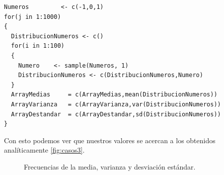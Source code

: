 \documentclass[]{article}
\begin{document}
      \begin{lstlisting}
Numeros         <- c(-1,0,1)
for(j in 1:1000)
{
  DistribucionNumeros <- c()
  for(i in 1:100)
  {
    Numero    <- sample(Numeros, 1)
    DistribucionNumeros <- c(DistribucionNumeros,Numero)
  }
  ArrayMedias     = c(ArrayMedias,mean(DistribucionNumeros))
  ArrayVarianza   = c(ArrayVarianza,var(DistribucionNumeros))
  ArrayDestandar  = c(ArrayDestandar,sd(DistribucionNumeros))
}

      \end{lstlisting}
Con esto podemos ver que nuestros valores se acercan a los obtenidos analíticamente \autoref{fig:casos3}.
 \begin{figure}[hbt!]
\centering
{}%
\hfill
{}%
\hfill
{}%
\hfill

\caption{Frecuencias de la media, varianza y desviación estándar.}

\label{fig:casos3}
\end{figure} 
\printbibliography[title={Referencias}]
\end{document}
